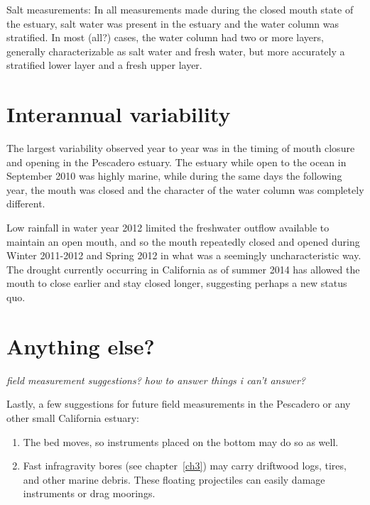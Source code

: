 Salt measurements:
In all measurements made during the closed mouth state of the estuary, salt water was present in the estuary and the water column was stratified. In most (all?) cases, the water column had two or more layers, generally characterizable as salt water and fresh water, but more accurately a stratified lower layer and a fresh upper layer. 








\section{Interannual variability} \label{IntannVar}

The largest variability observed year to year was in the timing of mouth closure and opening in the Pescadero estuary. The estuary while open to the ocean in September 2010 was highly marine, while during the same days the following year, the mouth was closed and the character of the water column was completely different. 

Low rainfall in water year 2012 limited the freshwater outflow available to maintain an open mouth, and so the mouth repeatedly closed and opened during Winter 2011-2012 and Spring 2012 in what was a seemingly uncharacteristic way. The drought currently occurring in California as of summer 2014 has allowed the mouth to close earlier and stay closed longer, suggesting perhaps a new status quo. 

\section{Anything else?} \label{backofch2}

\emph{field measurement suggestions? how to answer things i can't
answer?}

Lastly, a few suggestions for future field measurements in the Pescadero or any other small California estuary: 
\begin{enumerate}
	\item The bed moves, so instruments placed on the bottom may do so as well.
	\item Fast infragravity bores (see chapter~\ref{ch3}) may carry driftwood logs, tires, and other marine debris. These floating projectiles can easily damage instruments or drag moorings.
\end{enumerate}


